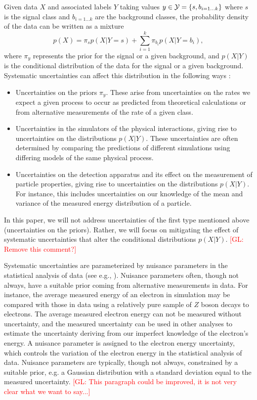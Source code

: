 \documentclass[twocolumn,superscriptaddress,aps]{revtex4-1}
\newcommand{\glnote}[1]{\textcolor{red}{[GL: #1]}}
\theoremstyle{plain}
\begin{document}
Given data $X$ and associated labels $Y$
taking values $y \in {\cal Y} = \{s,
b_{i=1...k} \}$ where $s$ is the signal class and $b_{i=1...k}$ are
the background classes, the probability density of the data
can be written as a mixture
\begin{equation}
p(X) = \pi_s p(X|Y=s) + \sum_{i=1}^{k} \pi_{b_i} p(X | Y=b_i),
\end{equation}
where $\pi_{y}$ represents the prior for the signal or a given
background, and $p(X|Y)$ is the conditional distribution of the data
for the signal or a given background. Systematic uncertainties can
affect this distribution in the following ways \citep{sinervo2003definition,bohm2010introduction}:
\begin{itemize}
\item Uncertainties on the priors $\pi_{y}$.  These arise from
  uncertainties on the rates we expect a given process to occur as
  predicted from theoretical calculations or from alternative
  measurements of the rate of a given class.

\item Uncertainties in the simulators of the physical interactions,
  giving rise to uncertainties on the distributions $p(X|Y)$.  These
  uncertainties are often determined by comparing the predictions of
  different simulations using differing models of the same physical
  process.

\item Uncertainties on the detection apparatus and its effect on the
  measurement of particle properties, giving rise to uncertainties on
  the distributions $p(X|Y)$.  For instance, this includes
  uncertainties on our knowledge of the mean and variance of the
  measured energy distribution of a particle.
\end{itemize}
In this paper, we will not address uncertainties of the first type
mentioned above (uncertainties on the priors).  Rather, we will focus
on mitigating the effect of systematic uncertainties that alter the
conditional distributions $p(X|Y)$. \glnote{Remove this comment?}

Systematic uncertainties are parameterized by nuisance parameters in the
statistical analysis of data (see e.g.,
\citep{bohm2010introduction,cowan2011asymptotic}).  Nuisance parameters often,
though not always, have a suitable prior coming from alternative measurements in
data.  For instance, the average measured energy of an electron in simulation
may be compared with those in data using a relatively pure sample of $Z$ boson
decays to electrons.  The average measured electron energy can not be measured
without uncertainty, and the measured uncertainty can be used in other analyses
to estimate the uncertainty deriving from our imperfect knowledge of the
electron's energy.  A nuisance parameter is assigned to the electron energy
uncertainty, which controls the variation of the electron energy in the
statistical analysis of data.  Nuisance parameters are typically, though not
always, constrained by a suitable prior, e.g. a Gaussian distribution with a
standard deviation equal to the measured uncertainty. \glnote{This paragraph
could be improved, it is not very clear what we want to say...}
\end{document}
